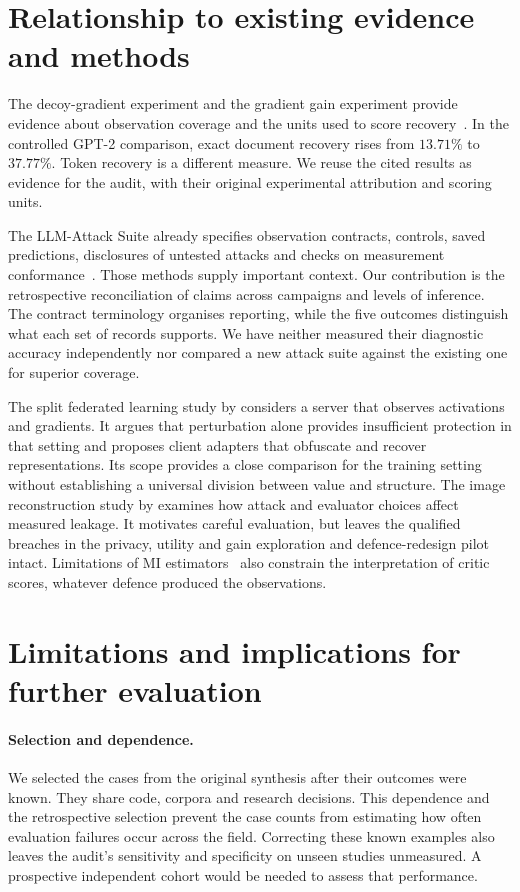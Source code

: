 \section{Relationship to existing evidence and methods}
\label{sec:related}

The decoy-gradient experiment and the gradient gain experiment provide
evidence about observation coverage and the units used to score
recovery~\citep{paper1,gradients2026}. In the controlled GPT-2 comparison,
exact document recovery rises from $13.71\%$ to $37.77\%$. Token recovery
is a different measure. We reuse the cited results as evidence for the
audit, with their original experimental attribution and scoring units.

The LLM-Attack Suite already specifies observation contracts, controls,
saved predictions, disclosures of untested attacks and checks on measurement
conformance~\citep{suite2026}. Those methods supply important context.
Our contribution is the retrospective reconciliation of claims across
campaigns and levels of inference. The contract terminology organises
reporting, while the five outcomes distinguish what each set of records
supports. We have neither measured their diagnostic accuracy independently
nor compared a new attack suite against the existing one for superior
coverage.

The split federated learning study by \citet{privpair2026} considers a
server that observes activations and gradients. It argues that perturbation
alone provides insufficient protection in that setting and proposes
client adapters that obfuscate and recover representations. Its scope
provides a close comparison for the training setting without establishing
a universal division between value and structure. The image reconstruction
study by \citet{mia2026} examines how attack and evaluator choices affect
measured leakage. It motivates careful evaluation, but leaves the qualified
breaches in the privacy, utility and gain exploration and defence-redesign
pilot intact. Limitations of MI estimators~\citep{mcallester2020,song2020}
also constrain the interpretation of critic scores, whatever defence
produced the observations.

\section{Limitations and implications for further evaluation}
\label{sec:limits}

\paragraph{Selection and dependence.}
We selected the cases from the original synthesis after their outcomes
were known. They share code, corpora and research decisions. This
dependence and the retrospective selection prevent the case counts from
estimating how often evaluation failures occur across the field.
Correcting these known examples also leaves the audit's sensitivity and
specificity on unseen studies unmeasured. A prospective independent cohort
would be needed to assess that performance.

